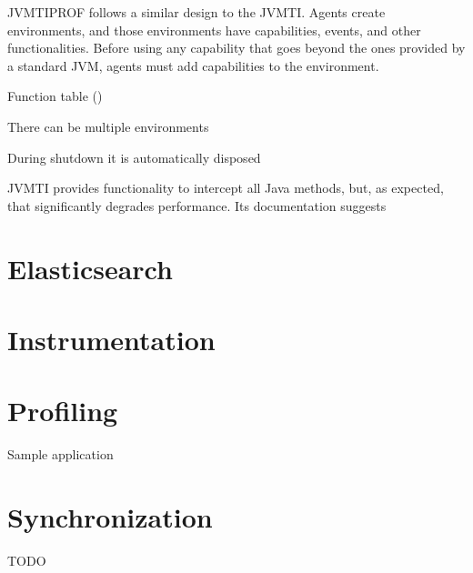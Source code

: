 JVMTIPROF follows a similar design to the JVMTI. Agents create environments, and those environments have capabilities, events, and other functionalities. Before using any capability that goes beyond the ones provided by a standard JVM, agents must add capabilities to the environment. %

Function table ()

There can be multiple environments

During shutdown it is automatically disposed

JVMTI provides functionality to intercept all Java methods, but, as expected, that significantly degrades performance. Its documentation suggests






\section{Elasticsearch}

\section{Instrumentation}



\section{Profiling}




Sample application



\section{Synchronization}


TODO





